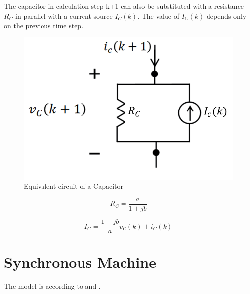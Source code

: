 The capacitor in calculation step k+1 can also be substituted with a resistance $R_C$ in parallel with a current source $I_C(k)$. The value of $I_C(k)$ depends only on the previous time step.

\begin{figure}[ht]
	\centering
	\includegraphics[scale=0.6]{img/Capacitor.png} 
	\caption{Equivalent circuit of a Capacitor}
	\label{fig:Capacitor}
\end{figure}

\begin{equation}
	R_C = \frac{a}{1+jb}
\end{equation}

\begin{equation}
	I_C = \frac{1-jb}{a} v_C(k) + i_C(k)
\end{equation}


\section{Synchronous Machine}

The model is according to \cite{wang2010methods} and \cite{kundur1994power}. 


